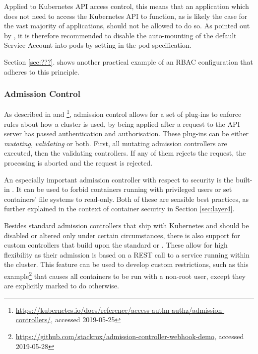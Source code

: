Applied to Kubernetes API access control, this means that an application which does not need to access the Kubernetes API to function, as is likely the case for the vast majority of applications, should not be allowed to do so. As pointed out by \textcite{kubernetessecurity}, it is therefore recommended to disable the auto-mounting of the default Service Account into pods by setting  in the pod specification. 



Section \ref{sec:???}. shows another practical example of an \ac{RBAC} configuration that adheres to this principle.



\subsubsection{Admission Control} \label{admissionControl}

As described in \cite{admissionControl} and \cite{k8sdocs}\footnote{\url{https://kubernetes.io/docs/reference/access-authn-authz/admission-controllers/}, accessed 2019-05-25}, admission control allows for a set of plug-ins to enforce rules about how a cluster is used, by being applied after a request to the API server has passed authentication and authorisation. These plug-ins can be either \textit{mutating}, \textit{validating} or both. First, all mutating admission controllers are executed, then the validating controllers. If any of them rejects the request, the processing is aborted and the request is rejected.

An especially important admission controller with respect to security is the built-in . It can be used to forbid containers running with privileged users or set containers' file systems to read-only. Both of these are sensible best practices, as further explained in the context of container security in Section \ref{sec:layer4}.

Besides standard admission controllers that ship with Kubernetes and should be disabled or altered only under certain circumstances, there is also support for custom controllers that build upon the standard  or . These allow for high flexibility as their admission is based on a REST call to a service running within the cluster. This feature can be used to develop custom restrictions, such as this example\footnote{\url{https://github.com/stackrox/admission-controller-webhook-demo}, accessed 2019-05-28} that causes all containers to be run with a non-root user, except they are explicitly marked to do otherwise. 

